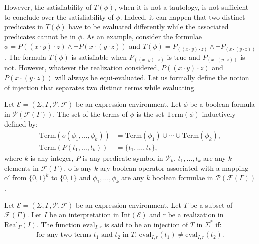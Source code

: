 \documentclass[a4paper]{llncs}
\begin{document}
  However, the satisfiability of $T(\phi)$, when it is not a tautology, is not sufficient to conclude over the satisfiability of $\phi$. 
  Indeed, 
  it can happen that two distinct predicates in $T(\phi)$ have to be evaluated differently while the associated predicates cannot be in $\phi$. 
  As an example, consider the formulae $\phi=P((x\cdot y)\cdot z)\wedge \neg P(x\cdot(y\cdot z))$ and $T(\phi)=P_{((x\cdot y)\cdot z)}\wedge \neg P_{(x\cdot(y\cdot z))}$. The formula $T(\phi)$ is satisfiable when $P_{((x\cdot y)\cdot z)}$ is true and  $P_{(x\cdot(y\cdot z))}$ is not. However, whatever the realization considered, $P((x\cdot y)\cdot z)$ and $P(x\cdot(y\cdot z))$ will always be equi-evaluated. Let us formally define the notion of injection that separates two distinct terms while evaluating.  
    
  Let $\mathcal{E}=(\Sigma,\Gamma,\mathcal{P},\mathcal{F})$ be an expression environment. Let $\phi$ be a boolean formula in $\mathcal{P}(\mathcal{F}(\Gamma))$. The set of the terms of $\phi$ is the set $\mathrm{Term}(\phi)$ inductively defined by:
        \begin{align*}
          \mathrm{Term}(o(\phi_1,\ldots,\phi_k))&=\mathrm{Term}(\phi_1)\cup\cdots\cup \mathrm{Term}(\phi_k),\\
          \mathrm{Term}(P(t_1,\ldots,t_k))&=\{t_1,\ldots,t_k\},
        \end{align*}
        where $k$ is any integer, $P$ is any predicate symbol in $\mathcal{P}_k$, $t_1,\ldots,t_k$ are any $k$ elements in $\mathcal{F}(\Gamma)$, $\mathrm{o}$ is any $k$-ary boolean operator associated with a mapping $\mathrm{o}'$ from $\{0,1\}^k$ to $\{0,1\}$ and $\phi_1,\ldots,\phi_k$ are any $k$ boolean formulae in $\mathcal{P}(\mathcal{F}(\Gamma))$.
    
  \begin{definition}[Injection]
    Let $\mathcal{E}=(\Sigma,\Gamma,\mathcal{P},\mathcal{F})$ be an expression environment. Let $T$ be a subset of $\mathcal{F}(\Gamma)$. Let $I$ be an interpretation in $\mathrm{Int}(\mathcal{E})$ and $\mathrm{r}$ be a realization in $\mathrm{Real}_\Gamma(I)$. The function $\mathrm{eval}_{I,r}$ is said to be an injection of $T$ in $\Sigma^*$ if:
        \begin{align*}
          \text{for any two terms $t_1$ and $t_2$ in  $T$, $\mathrm{eval}_{I,r}(t_1)\neq \mathrm{eval}_{I,r}(t_2)$}.
        \end{align*}
  \end{definition}
  
\end{document}
